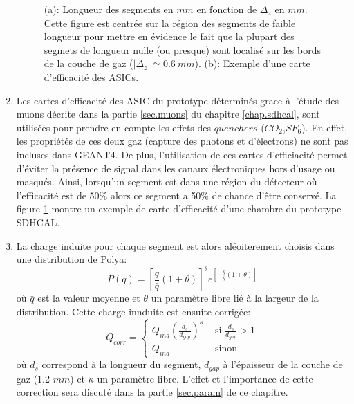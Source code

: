 \begin{enumerate}[~~1-]
\begin{figure}[!ht]
    \caption{(a): Longueur des segments en $mm$ en fonction de $\Delta_z$ en $mm$. Cette figure est centrée sur la région des segments de faible longueur pour mettre en évidence le fait que la plupart des segmets de longueur nulle (ou presque) sont localisé sur les bords de la couche de gaz ($|\Delta_z|\simeq0.6\ mm$). (b): Exemple d'une carte d'efficacité des ASICs.}
    \label{fig.map_and_length_vs_deltaz}
  \end{figure}
\item Les cartes d'efficacité des ASIC du prototype déterminés grace à l'étude des muons décrite dans la partie \ref{sec.muons} du chapitre \ref{chap.sdhcal}, sont utilisées pour prendre en compte les effets des $quenchers$ ($CO_2$,$SF_6$). En effet, les propriétés de ces deux gaz (capture des photons et d'électrons) ne sont pas incluses dans GEANT4. De plus, l'utilisation de ces cartes d'efficiacité permet d'éviter la présence de signal dans les canaux électroniques hors d'usage ou masqués. Ainsi, lorsqu'un segment est dans une région du détecteur où l'efficacité est de 50\% alors ce segment a 50\% de chance d'être conservé. La figure \ref{fig.map_and_length_vs_deltaz} montre un exemple de carte d'efficacité d'une chambre du prototype SDHCAL.
\item La charge induite pour chaque segment est alors aléoiterement choisis dans une distribution de Polya: 
  \begin{equation}
    \label{eq.polya}
    P(q)=[\frac{q}{\bar q}(1+\theta)]^{\theta}e^{[-\frac{q}{\bar q}(1+\theta)]}
  \end{equation}
  où $\bar q$ est la valeur moyenne et $\theta$ un paramètre libre lié à la largeur de la distribution. Cette charge innduite est ensuite corrigée: 
  \begin{equation}
    \label{eq.lengthcorrection}
    Q_{corr} = \left\{ \begin{array}{rl}
      Q_{ind}(\frac{d_s}{d_{gap}})^\kappa &\mbox{ si $\frac{d_s}{d_{gap}}>1$} \\
      Q_{ind} &\mbox{ sinon}
    \end{array} \right.
  \end{equation}
  où $d_s$ correspond à la longueur du segment, $d_{gap}$ à l'épaisseur de la couche de gaz (1.2 $mm$) et $\kappa$ un paramètre libre. L'effet et l'importance de cette correction sera discuté dans la partie \ref{sec.param} de ce chapitre.

\end{enumerate}
